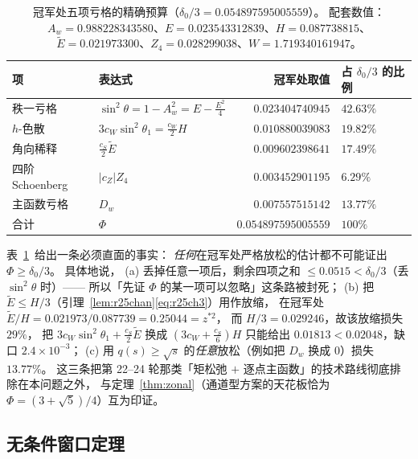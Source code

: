 \begin{table}[ht]\centering\small
\begin{tabular}{llrl}
\toprule
项 & 表达式 & 冠军处取值 & 占 $\delta_0/3$ 的比例\\
\midrule
秩一亏格 & $\sin^2\theta=1-A_w^2=E-\frac{E^2}4$ & $0.023404740945$ & $42.63\%$\\
$h$-色散 & $3c_W\sin^2\theta_1=\frac{c_W}2H$ & $0.010880039083$ & $19.82\%$\\
角向稀释 & $\frac{c_S}2\widetilde E$ & $0.009602398641$ & $17.49\%$\\
四阶 Schoenberg & $|c_Z|Z_4$ & $0.003452901195$ & $6.29\%$\\
主函数亏格 & $D_w$ & $0.007557515142$ & $13.77\%$\\
\midrule
合计 & $\Phi$ & $0.054897595005559$ & $100\%$\\
\bottomrule
\end{tabular}
\caption{冠军处五项亏格的精确预算（$\delta_0/3=0.054897595005559$）。
配套数值：$A_w=0.988228343580$、$E=0.023543312839$、$H=0.087738815$、
$\widetilde E=0.021973300$、$Z_4=0.028299038$、$W=1.719340161947$。}\label{tab:r25budget}
\end{table}

\begin{remark}\label{rem:r25no}
表~\ref{tab:r25budget}~给出一条必须直面的事实：
\emph{任何}在冠军处严格放松的估计都不可能证出 $\Phi\ge\delta_0/3$。
具体地说，
(a) 丢掉任意一项后，剩余四项之和 $\le0.0515<\delta_0/3$（丢 $\sin^2\theta$ 时）——
所以「先证 $\Phi$ 的某一项可以忽略」这条路被封死；
(b) 把 $\widetilde E\le H/3$（引理~\ref{lem:r25chan}\eqref{eq:r25ch3}）用作放缩，
在冠军处 $\widetilde E/H=0.021973/0.087739=0.25044=z^{*2}$，
而 $H/3=0.029246$，故该放缩损失 $29\%$，
把 $3c_W\sin^2\theta_1+\frac{c_S}2\widetilde E$ 换成 $(3c_W+\frac{c_S}6)H$
只能给出 $0.01813<0.02048$，缺口 $2.4\times10^{-3}$；
(c) 用 $q(s)\ge\sqrt s$ 的\emph{任意}放松（例如把 $D_w$ 换成 $0$）损失 $13.77\%$。
这三条把第 22--24 轮那类「矩松弛 $+$ 逐点主函数」的技术路线彻底排除在本问题之外，
与定理~\ref{thm:zonal}（通道型方案的天花板恰为 $\Phi=(3+\sqrt5)/4$）互为印证。
\end{remark}

\subsection{无条件窗口定理}\label{sec:r25:window}

